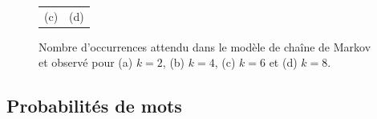 \documentclass[a4paper,12pt]{article}
\begin{document}
\begin{figure}
\begin{tabular}{@{} c @{} c @{}}
(c) & (d) \tabularnewline
\end{tabular}
\caption{Nombre d'occurrences attendu dans le modèle de chaîne de Markov et observé pour (a) $k = 2$, (b) $k = 4$, (c) $k = 6$ et (d) $k = 8$.}
\label{FigNbOccurrencesMarkov}
\end{figure}

\subsection{Probabilités de mots}
\end{document}
